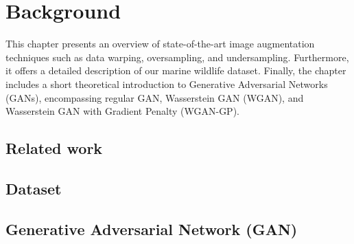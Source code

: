 \chapter{Background}\label{background}
This chapter presents an overview of state-of-the-art image augmentation techniques such as data warping, oversampling, and undersampling. Furthermore, it offers a detailed description of our marine wildlife dataset. Finally, the chapter includes a short theoretical introduction to Generative Adversarial Networks (GANs), encompassing regular GAN, Wasserstein GAN (WGAN), and Wasserstein GAN with Gradient Penalty (WGAN-GP).
\section{Related work}
 \label{related work}
\section{Dataset}

% 
% 
\section{Generative Adversarial Network (GAN)} \label{bg:gan}






